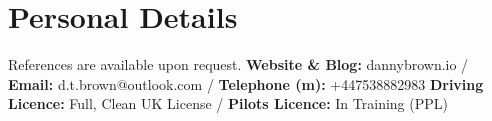 \documentclass[10pt,letterpaper]{article}
\begin{document}
	\section*{Personal Details}
 	\noindent References are available upon request. \newline \newline
	\textbf{Website \& Blog:} dannybrown.io / \textbf{Email:} d.t.brown@outlook.com / \textbf{Telephone (m):} +447538882983 \newline \textbf{Driving Licence:} Full, Clean UK License / \textbf{Pilots Licence:} In Training (PPL)
\end{document}
